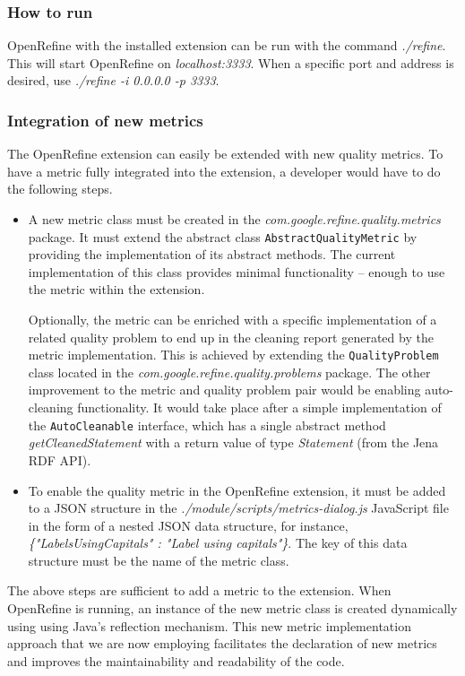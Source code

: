 \subsubsection{How to run}

OpenRefine with the installed extension can be run with the command \textit{./refine}.  This will start OpenRefine on \textit{localhost:3333}.
When a specific port and address is desired, use \textit{./refine -i 0.0.0.0 -p 3333}.

\subsubsection{Integration of new metrics}
The OpenRefine extension can easily be extended with new quality metrics.
To have a metric fully integrated into the extension, a developer would have to do the following steps.

\begin{itemize}
	\item A new metric class must be created in the \textit{com.google.refine.quality.metrics} package.  It must extend the abstract class \texttt{AbstractQualityMetric} by providing the implementation of its abstract methods.  The current implementation of this class provides minimal functionality – enough to use the metric within the extension. 
	
	Optionally, the metric can be enriched with a specific implementation of a related quality problem to end up in the cleaning report generated by the metric implementation.  This is achieved by extending the \texttt{QualityProblem} class located in the \textit{com.google.refine.quality.problems} package. The other improvement to the metric and quality problem pair would be enabling auto-cleaning functionality. It would take place after a simple implementation of the \texttt{AutoCleanable} interface, which has a single abstract method \textit{getCleanedStatement} with a return value of type \textit{Statement} (from the Jena RDF API).
	
	\item To enable the quality metric in the OpenRefine extension, it must be added to a JSON structure in the \textit{./module/scripts/metrics-dialog.js} JavaScript file in the form of a nested JSON data structure, for instance, \textit{\{"LabelsUsingCapitals" : "Label using capitals"\}}.  The key of this data structure must be the name of the metric class.
\end{itemize}

The above steps are sufficient to add a metric to the extension. When OpenRefine is running, an instance of the new metric class is created dynamically using using Java's reflection mechanism.  This new metric implementation approach that we are now employing facilitates the declaration of new metrics and improves the maintainability and readability of the code. 

